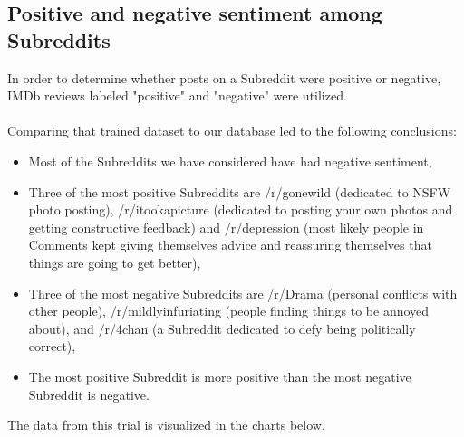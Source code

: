 \documentclass[openany]{article}
\begin{document}
\subsection{Positive and negative sentiment among Subreddits}
In order to determine whether posts on a Subreddit were positive or negative, IMDb reviews labeled "positive" and "negative" were utilized\cite{sentimentanalysis}. \\ \\
Comparing that trained dataset to our database led to the following conclusions:
\begin{itemize}
    \item Most of the Subreddits we have considered have had negative sentiment,
    \item Three of the most positive Subreddits are /r/gonewild (dedicated to NSFW photo posting), /r/itookapicture (dedicated to posting your own photos and getting constructive feedback) and /r/depression (most likely people in Comments kept giving themselves advice and reassuring themselves that things are going to get better),
    \item Three of the most negative Subreddits are /r/Drama (personal conflicts with other people), /r/mildlyinfuriating (people finding things to be annoyed about), and /r/4chan (a Subreddit dedicated to defy being politically correct),
    \item The most positive Subreddit is more positive than the most negative Subreddit is negative.
\end{itemize}
The data from this trial is visualized in the charts below.
\end{document}
